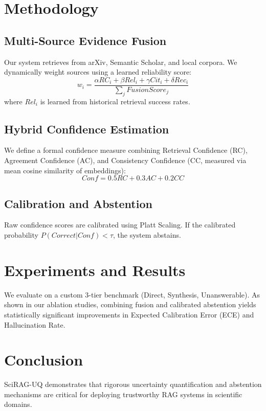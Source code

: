 \documentclass[conference]{IEEEtran}
\begin{document}
\section{Methodology}

\subsection{Multi-Source Evidence Fusion}
Our system retrieves from arXiv, Semantic Scholar, and local corpora. We dynamically weight sources using a learned reliability score:
\begin{equation}
w_i = \frac{\alpha RC_i + \beta Rel_i + \gamma Cit_i + \delta Rec_i}{\sum_j FusionScore_j}
\end{equation}
where $Rel_i$ is learned from historical retrieval success rates.

\subsection{Hybrid Confidence Estimation}
We define a formal confidence measure combining Retrieval Confidence (RC), Agreement Confidence (AC), and Consistency Confidence (CC, measured via mean cosine similarity of embeddings):
\begin{equation}
Conf = 0.5 RC + 0.3 AC + 0.2 CC
\end{equation}

\subsection{Calibration and Abstention}
Raw confidence scores are calibrated using Platt Scaling. If the calibrated probability $P(Correct|Conf) < \tau$, the system abstains.

\section{Experiments and Results}
We evaluate on a custom 3-tier benchmark (Direct, Synthesis, Unanswerable). As shown in our ablation studies, combining fusion and calibrated abstention yields statistically significant improvements in Expected Calibration Error (ECE) and Hallucination Rate.

\section{Conclusion}
SciRAG-UQ demonstrates that rigorous uncertainty quantification and abstention mechanisms are critical for deploying trustworthy RAG systems in scientific domains.
\end{document}
